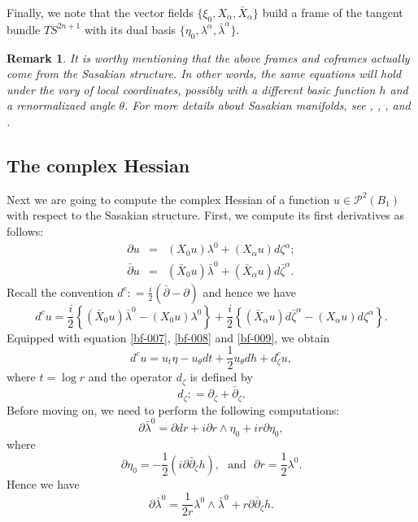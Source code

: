 \documentclass[a4paper,11pt]{amsart}
\numberwithin{equation}{section}
\newtheorem{rem}[theorem]{Remark}
\def\dbar{\bar\partial}
\def\ddbar{\partial\bar\partial}
\def\d{\partial}
\def\cP{{\mathcal P}}
\def\cP{{\mathcal P}}
\def\a{{\alpha}}
\def\z{{\zeta}}
\begin{document}
Finally, 
we note that
the vector fields $\{ \xi_0, X_{\a}, \bar X_{\a} \}$
build a frame of the tangent bundle $TS^{2n+1}$
with its dual basis $\{ \eta_0, \lambda^{\a}, \bar\lambda^{\a} \}$. 

\begin{rem}
It is worthy mentioning that the above frames and coframes 
actually come from the Sasakian structure. 
In other words, the same equations will hold under the vary of local coordinates,
possibly with a different basic function $h$ and a renormalizaed angle $\theta$. 
For more details about Sasakian manifolds, see \cite{GKN00}, \cite{GZ12}, \cite{HL21}, \cite{H13} and \cite{HS16}.
\end{rem}

\subsection{The complex Hessian}
Next we are going to compute the complex Hessian of 
a function $u\in \cP^{2}(B_1)$ with respect to the Sasakian structure. 
First, we compute its first derivatives as follows: 
\begin{eqnarray}
\label{ch-001}
\d u &=& (X_0 u) \lambda^0 + (X_\a u) d\z^{\a};
\\
\label{ch-002}
\dbar u &=&  (\bar X_0 u) \bar{\lambda}^0 + (\bar X_\a u) d\bar\z^{\a}.
\end{eqnarray}
Recall the convention $d^c: = \frac{i}{2} (\dbar - \d)$
and hence we have 
\begin{equation}
\label{ch-003}
d^c u = \frac{i}{2}\left\{  (\bar X_0 u) \bar\lambda^0 - (X_0 u) \lambda^0  \right\} + \frac{i}{2}\left\{(\bar X_\a u) d\bar\z^{\a}   - (X_\a u) d\z^{\a} \right\}.
\end{equation}
Equipped with equation \eqref{bf-007}, \eqref{bf-008} and \eqref{bf-009}, 
we obtain 
\begin{equation}
\label{ch-004}
d^c u = u_t \eta - u_{\theta} dt + \frac{1}{2} u_{\theta} dh + d^c_{\z} u,
\end{equation}
where $t=\log r$ and the operator $d_{\z}$ is defined by 
$$  d_{\z}: = \d_{\z} + \dbar_{\z}. $$
Before moving on, 
we need to perform the following computations:  
\begin{equation}
\label{ch-005}
\d \bar \lambda^0 = \d dr  + i \d r \wedge \eta_0 + i r \d \eta_0,
\end{equation}
where 
$$ \d \eta_0 = - \frac{1}{2} (i \ddbar_{\z} h), \ \ \ \mbox{and} \ \ \  \d r = \frac{1}{2} \lambda^0.  $$
Hence we have 
\begin{equation}
\label{ch-006}
\d \bar \lambda^0 = \frac{1}{2r} \lambda^0 \wedge \bar\lambda^0 + r\ddbar_{\z} h.
\end{equation}
\end{document}

